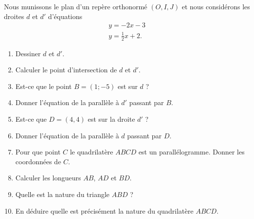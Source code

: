 
\begin{exercice}\label{exosmath-0000}

    Nous munissons le plan d'un repère orthonormé \( (O,I,J)\) et nous considérons les droites \( d\) et \( d'\) d'équations
    \begin{subequations}
        \begin{align}
            y=-2x-3\\
            y=\frac{ 1 }{2}x+2.
        \end{align}
    \end{subequations}
    \begin{multicols}{2}
    \begin{enumerate}
        \item
            Dessiner \( d\) et \( d'\).
        \item
            Calculer le point d'intersection de \( d\) et \( d'\).
        \item
            Est-ce que le point \( B=(1;-5)\) est sur \( d\) ?
        \item
            Donner l'équation de la parallèle à \( d'\) passant par \( B\).
        \item
            Est-ce que \( D=(4,4)\) est sur la droite \( d'\) ?
        \item
            Donner l'équation de la parallèle à \( d\) passant par \( D\).
        \item
            Pour que point \( C\) le quadrilatère \( ABCD\) est un parallélogramme. Donner les coordonnées de \( C\).
        \item
            Calculer les longueurs \( AB\), \( AD\) et \( BD\).
        \item
            Quelle est la nature du triangle \( ABD\) ?
        \item
            En déduire quelle est précisément la nature du quadrilatère \( ABCD\).
    \end{enumerate}
    \end{multicols}

\end{exercice}

